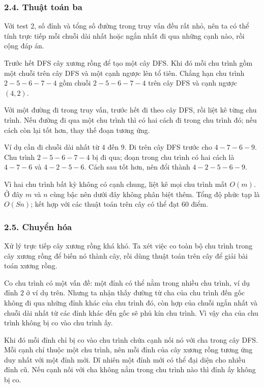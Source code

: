 \documentclass[11pt]{article}
\begin{document}
\subsubsection*{2.4. Thuật toán ba}

Với test 2, số đỉnh và tổng số đường trong truy vấn đều rất nhỏ, nên ta có thể
tính trực tiếp mỗi chuỗi dài nhất hoặc ngắn nhất đi qua những cạnh nào, rồi
cộng đáp án.

Trước hết DFS cây xương rồng để tạo một cây DFS. Khi đó mỗi chu trình gồm một
chuỗi trên cây DFS và một cạnh ngược lên tổ tiên. Chẳng hạn chu trình
\(2-5-6-7-4\) gồm chuỗi \(2-5-6-7-4\) trên cây DFS và cạnh ngược \((4,2)\).

Với một đường đi trong truy vấn, trước hết đi theo cây DFS, rồi liệt kê từng
chu trình. Nếu đường đi qua một chu trình thì có hai cách đi trong chu trình
đó; nếu cách còn lại tốt hơn, thay thế đoạn tương ứng.

Ví dụ cần đi chuỗi dài nhất từ \(4\) đến \(9\). Đi trên cây DFS trước cho
\(4-7-6-9\). Chu trình \(2-5-6-7-4\) bị đi qua; đoạn trong chu trình có hai
cách là \(4-7-6\) và \(4-2-5-6\). Cách sau tốt hơn, nên đổi thành
\(4-2-5-6-9\).

Vì hai chu trình bất kỳ không có cạnh chung, liệt kê mọi chu trình mất
\(O(m)\). Ở đây \(m\) và \(n\) cùng bậc nên dưới đây không phân biệt thêm.
Tổng độ phức tạp là \(O(Sn)\); kết hợp với các thuật toán trên cây có thể đạt
60 điểm.

\subsubsection*{2.5. Chuyển hóa}

Xử lý trực tiếp cây xương rồng khá khó. Ta xét việc co toàn bộ chu trình trong
cây xương rồng để biến nó thành cây, rồi dùng thuật toán trên cây để giải bài
toán xương rồng.

Co chu trình có một vấn đề: một đỉnh có thể nằm trong nhiều chu trình, ví dụ
đỉnh \(2\) ở ví dụ trên. Nhưng ta nhận thấy đường từ cha của chu trình đến gốc
không đi qua những đỉnh khác của chu trình đó, còn hợp của chuỗi ngắn nhất và
chuỗi dài nhất từ các đỉnh khác đến gốc sẽ phủ kín chu trình. Vì vậy cha của
chu trình không bị co vào chu trình ấy.

Khi đó mỗi đỉnh chỉ bị co vào chu trình chứa cạnh nối nó với cha trong cây
DFS. Mỗi cạnh chỉ thuộc một chu trình, nên mỗi đỉnh của cây xương rồng tương
ứng duy nhất với một đỉnh mới. Dĩ nhiên một đỉnh mới có thể đại diện cho
nhiều đỉnh cũ. Nếu cạnh nối với cha không nằm trong chu trình nào thì đỉnh ấy
không bị co.
\end{document}
